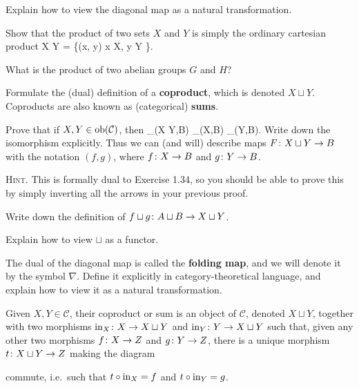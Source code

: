 \bx
Explain how to view the diagonal map as a natural transformation.
\ex

\bs
\es

\bx
\ben[label=(\alph*)]
\item Show that the product of two sets $X$ and $Y$ is simply the ordinary cartesian product
\bse
X \times Y = \{(x, y) \mid x \in X, y \in Y \}.
\ese
\item What is the product of two abelian groups $G$ and $H$?
\een
\ex

\bs
\ben[label=(\alph*)]
\item
\item
\een
\es

\bp
\ben[label=(\alph*)]
\item Formulate the (dual) definition of a \textbf{coproduct}, which is denoted $X\sqcup Y$. Coproducts are also known as (categorical) \textbf{sums}.
\item Prove that if $X, Y \in \operatorname{ob}(\mathcal{C})$, then
\bse
\mor_{}(X \sqcup Y,B) \cong \mor_{}(X,B) \times \mor_{}(Y,B).
\ese
Write down the isomorphism explicitly. Thus we can (and will) describe maps $F \colon X\sqcup Y \to B$ with the notation $(f, g)$, where $f \colon X \to B$ and $g \colon Y \to B$.

{\scshape Hint}. This is formally dual to Exercise 1.34, so you should be able to prove this by simply inverting all the arrows in your previous proof.
\item Write down the definition of $f \sqcup g \colon A \sqcup B \to X \sqcup Y$.
\item Explain how to view $\sqcup$ as a functor.
\item The dual of the diagonal map is called the \textbf{folding map}, and we will denote it by the symbol $\nabla$. Define it explicitly in category-theoretical language, and explain how to view it as a natural transformation.
\een
\ep

\bs
\ben[label=(\alph*)]
\item Given $X,Y\in\mathcal{C}$, their coproduct or sum is an object of $\mathcal{C}$, denoted $X \sqcup Y$, together with two morphisms $\mathrm{in}_X\colon X\to X\sqcup Y$ and $\mathrm{in}_Y\colon Y\to X\sqcup Y$ such that, given any other two morphisms $f\colon X\to Z$ and $g\colon Y\to Z$, there is a unique morphism $t\colon X\sqcup Y\to Z$ making the diagram
\bse
{}
\ese
commute, i.e.\ such that $t\circ \mathrm{in}_X=f$ and $t\circ \mathrm{in}_Y=g$. 


